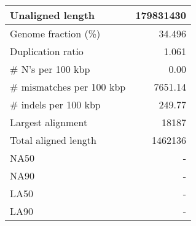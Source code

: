 \documentclass[12pt,a4paper]{article}
\begin{document}
\begin{table}[ht]
\begin{center}
\begin{tabular}{|l*{1}{|r}|}
Unaligned length & 179831430 \\ \hline
Genome fraction (\%) & 34.496 \\ \hline
Duplication ratio & 1.061 \\ \hline
\# N's per 100 kbp & 0.00 \\ \hline
\# mismatches per 100 kbp & 7651.14 \\ \hline
\# indels per 100 kbp & 249.77 \\ \hline
Largest alignment & 18187 \\ \hline
Total aligned length & 1462136 \\ \hline
NA50 & - \\ \hline
NA90 & - \\ \hline
LA50 & - \\ \hline
LA90 & - \\ \hline
\end{tabular}
\end{center}
\end{table}
\end{document}

